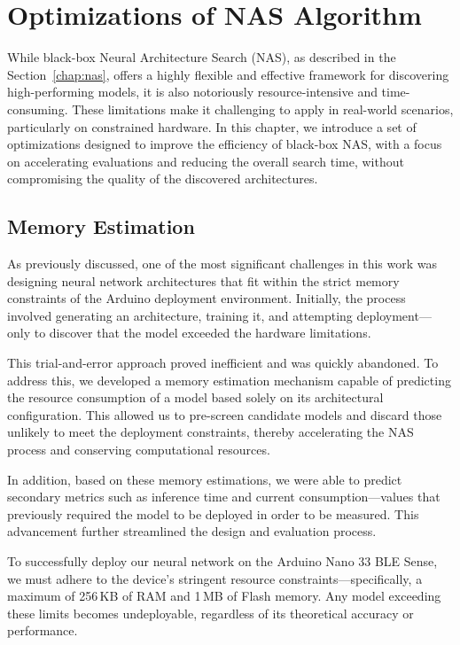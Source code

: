 \chapter{Optimizations of NAS Algorithm}
\label{chap:nas_optimizations}

\begin{sloppypar}
While black-box Neural Architecture Search (NAS), as described in the Section~\ref{chap:nas}, offers a highly flexible and effective framework for discovering high-performing models, it is also notoriously resource-intensive and time-consuming. These limitations make it challenging to apply in real-world scenarios, particularly on constrained hardware. In this chapter, we introduce a set of optimizations designed to improve the efficiency of black-box NAS, with a focus on accelerating evaluations and reducing the overall search time, without compromising the quality of the discovered architectures.
\end{sloppypar}

\section{Memory Estimation}

As previously discussed, one of the most significant challenges in this work was designing neural network architectures that fit within the strict memory constraints of the Arduino deployment environment. Initially, the process involved generating an architecture, training it, and attempting deployment—only to discover that the model exceeded the hardware limitations. 

This trial-and-error approach proved inefficient and was quickly abandoned. To address this, we developed a memory estimation mechanism capable of predicting the resource consumption of a model based solely on its architectural configuration. This allowed us to pre-screen candidate models and discard those unlikely to meet the deployment constraints, thereby accelerating the NAS process and conserving computational resources.

In addition, based on these memory estimations, we were able to predict secondary metrics such as inference time and current consumption—values that previously required the model to be deployed in order to be measured. This advancement further streamlined the design and evaluation process.


To successfully deploy our neural network on the Arduino Nano 33 BLE Sense, we must adhere to the device's stringent resource constraints—specifically, a maximum of 256\,KB of RAM and 1\,MB of Flash memory. Any model exceeding these limits becomes undeployable, regardless of its theoretical accuracy or performance.

